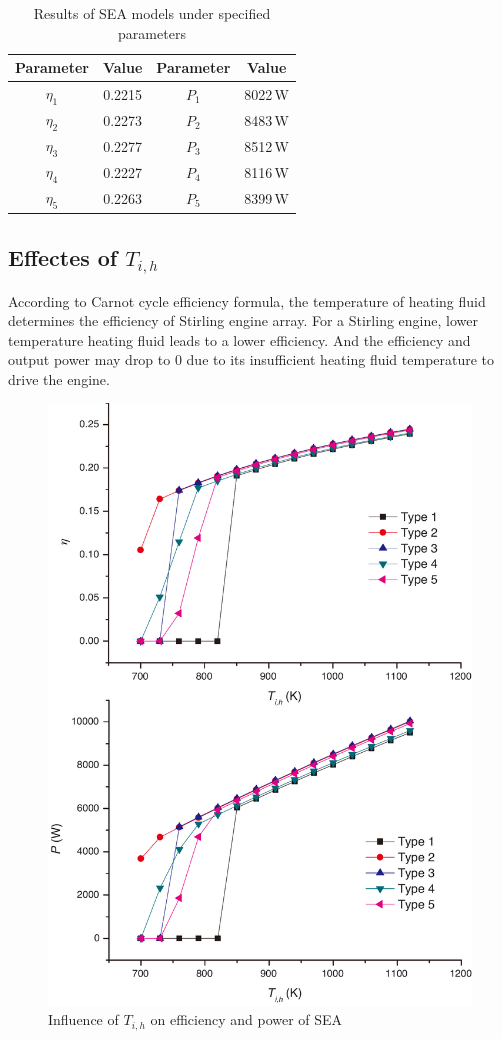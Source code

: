 \documentclass[preprint,5p, twocolumn]{elsarticle}
\begin{document}
\begin{table}[htbp]
	\caption{Results of SEA models under specified parameters}
	\begin{center}
	\begin{tabular}{cccc}
		\toprule
		Parameter		&	Value	&	Parameter		&	Value\\
		\midrule
		$\eta_1$	&	0.2215	&	$P_1$		&	8022\,W\\
		$\eta_2$	&	0.2273	&	$P_2$		&	8483\,W\\
		$\eta_3$	&	0.2277	&	$P_3$		&	8512\,W\\
		$\eta_4$	&	0.2227	&	$P_4$		&	8116\,W\\
		$\eta_5$	&	0.2263	&	$P_5$		&	8399\,W\\		
		\bottomrule
	\end{tabular}
	\end{center}
	\label{tab:result}
\end{table}

\subsection{Effectes of $T_{i,h}$}
According to Carnot cycle efficiency formula, the temperature of heating fluid determines the efficiency of Stirling engine array. For a Stirling engine, lower temperature heating fluid leads to a lower efficiency. And the efficiency and output power may drop to 0 due to its insufficient heating fluid temperature to drive the engine.

\noindent \begin{figure}[htbp]
\begin{center}
	\includegraphics[width = 0.7\columnwidth]{./graphics/T_ih}
	\caption{Influence of $T_{i,h}$ on efficiency and power of SEA}
	\label{fig:Ti_h}
\end{center}
\end{figure}
\end{document}
